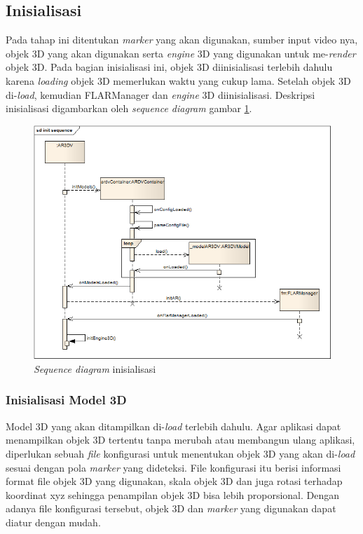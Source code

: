 \subsection{Inisialisasi}
\label{subsec:inisialisasi}
Pada tahap ini ditentukan \textit{marker} yang akan digunakan, sumber input video nya, objek 3D yang akan digunakan serta \textit{engine} 3D yang digunakan untuk me-\textit{render} objek 3D. Pada bagian inisialisasi ini, objek 3D diinisialisasi terlebih dahulu karena \textit{loading} objek 3D memerlukan waktu yang cukup lama. Setelah objek 3D di-\textit{load}, kemudian FLARManager dan \textit{engine} 3D diinisialisasi. Deskripsi inisialisasi digambarkan oleh \textit{sequence diagram} gambar \ref{fig:init_sequence}.

\begin{figure}[h]
\begin{center}
\includegraphics[width=14cm]{./images/init_sequence}
\caption{\label{fig:init_sequence} \textit{Sequence diagram} inisialisasi}
\end{center}
\end{figure}

\subsubsection {Inisialisasi Model 3D}
\label{subsubsec:inisialisasi_model_3d}
Model 3D yang akan ditampilkan di-\textit{load} terlebih dahulu. Agar aplikasi dapat menampilkan objek 3D tertentu tanpa merubah atau membangun ulang aplikasi, diperlukan sebuah \textit{file} konfigurasi untuk menentukan objek 3D yang akan di-\textit{load} sesuai dengan pola \textit{marker} yang dideteksi. File konfigurasi itu berisi informasi format file objek 3D yang digunakan, skala objek 3D dan juga rotasi terhadap koordinat xyz sehingga penampilan objek 3D bisa lebih proporsional. Dengan adanya file konfigurasi tersebut, objek 3D dan \textit{marker} yang digunakan dapat diatur dengan mudah.

